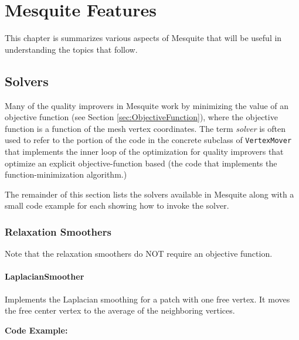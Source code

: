 \chapter{Mesquite Features}

  This chapter is summarizes various aspects of Mesquite that will be useful in understanding the topics that follow.

\section{Solvers}

Many of the quality improvers in Mesquite work by minimizing the value of an
objective function (see Section \ref{sec:ObjectiveFunction}), where the
objective function is a function of the mesh vertex coordinates. 
The term \emph{solver} is often used to refer to the portion of the code in
the concrete subclass of \texttt{VertexMover} that implements the inner loop
of the optimization for quality improvers that optimize an explicit 
objective-function based (the code that implements the function-minimization algorithm.)

The remainder of this section lists the solvers available in Mesquite along with a small code example for each showing how to invoke the solver.


\subsection{Relaxation Smoothers}

Note that the relaxation smoothers do NOT require an objective function.

\subsubsection{LaplacianSmoother} 

Implements the Laplacian smoothing for a patch with one free vertex.  It moves the free center vertex to the average of the neighboring vertices.

\textbf{Code Example:}

